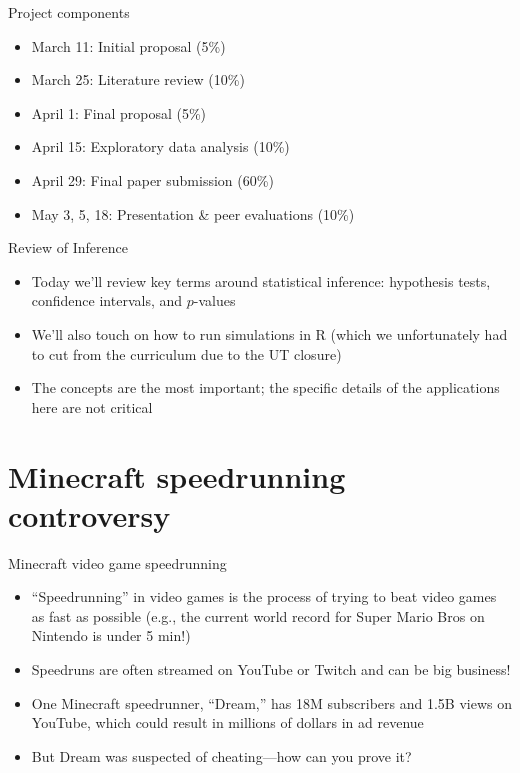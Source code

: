 \documentclass{beamer}\usepackage[]{graphicx}\usepackage[]{color}
\begin{document}
\begin{darkframes}
    \begin{frame}{Project components}
      \begin{itemize}
        \item March 11: Initial proposal (5\%)
        \item March 25: Literature review (10\%)
        \item April 1: Final proposal (5\%)
        \item April 15: Exploratory data analysis (10\%)
        \item April 29: Final paper submission (60\%)
        \item May 3, 5, 18: Presentation \& peer evaluations (10\%)
      \end{itemize}
    \end{frame}

    \begin{frame}{Review of Inference}
      \begin{itemize}
        \item Today we'll review key terms around statistical inference: hypothesis tests, confidence intervals, and $p$-values
        \item We'll also touch on how to run simulations in R (which we unfortunately had to cut from the curriculum due to the UT closure)
        \item The concepts are the most important; the specific details of the applications here are not critical
      \end{itemize}
    \end{frame}

    \section{Minecraft speedrunning controversy}

    \begin{frame}{Minecraft video game speedrunning}
      \begin{itemize}[<+->]
        \item ``Speedrunning'' in video games is the process of trying to beat video games as fast as possible (e.g., the current world record for Super Mario Bros on Nintendo is under 5 min!)
        \item Speedruns are often streamed on YouTube or Twitch and can be big business!
        \item One Minecraft speedrunner, ``Dream,'' has 18M subscribers and 1.5B views on YouTube, which could result in millions of dollars in ad revenue
        \item But Dream was suspected of cheating---how can you prove it?
      \end{itemize}
    \end{frame}


\end{darkframes}
\end{document}
